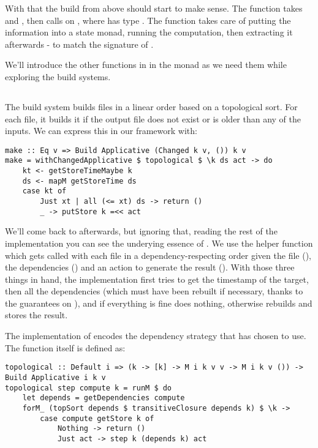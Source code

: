 With that the  build from above should start to make sense. The function  takes  and , then calls  on , where  has type . The  function takes care of putting the information into a state monad, running the computation, then extracting it afterwards - to match the signature of .

We'll introduce the other functions in in the monad  as we need them while exploring the build systems.

\subsection{\Make}\label{sec-implementation-make}

The \Make build system builds files in a linear order based on a topological sort. For each file, it builds it if the output file does not exist or is older than any of the inputs. We can express this in our framework with:

\begin{verbatim}
make :: Eq v => Build Applicative (Changed k v, ()) k v
make = withChangedApplicative $ topological $ \k ds act -> do
    kt <- getStoreTimeMaybe k
    ds <- mapM getStoreTime ds
    case kt of
        Just xt | all (<= xt) ds -> return ()
        _ -> putStore k =<< act
\end{verbatim}

We'll come back to  afterwards, but ignoring that, reading the rest of the implementation you can see the underying essence of \Make. We use the helper function  which gets called with each file in a dependency-respecting order given the file (), the dependencies () and an action to generate the result (). With those three things in hand, the implementation first tries to get the timestamp of the target, then all the dependencies (which must have been rebuilt if necessary, thanks to the guarantees on ), and if everything is fine does nothing, otherwise rebuilds and stores the result.

The implementation of  encodes the dependency strategy that \Make has chosen to use. The function itself is defined as:

\begin{verbatim}
topological :: Default i => (k -> [k] -> M i k v v -> M i k v ()) -> Build Applicative i k v
topological step compute k = runM $ do
    let depends = getDependencies compute
    forM_ (topSort depends $ transitiveClosure depends k) $ \k ->
        case compute getStore k of
            Nothing -> return ()
            Just act -> step k (depends k) act
\end{verbatim}

